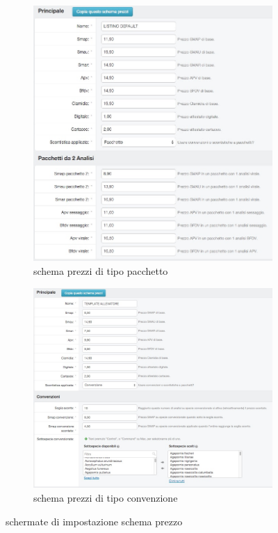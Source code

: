\begin{figure}
 \centering
 \begin{subfigure}[b]{0.49\textwidth}
   \includegraphics[width=\textwidth]{images/admin-pacchetto} 
   \caption{schema prezzi di tipo pacchetto}
   \label{fig:admin-pacchetto}
 \end{subfigure}
 \begin{subfigure}[b]{0.49\textwidth}
   \includegraphics[width=\textwidth]{images/admin-convenzione} 
   \caption{schema prezzi di tipo convenzione}
   \label{fig:admin-convenzione}
 \end{subfigure}
 \caption{schermate di impostazione schema prezzo}
 \label{fig:admin-schema-prezzi}
\end{figure}

